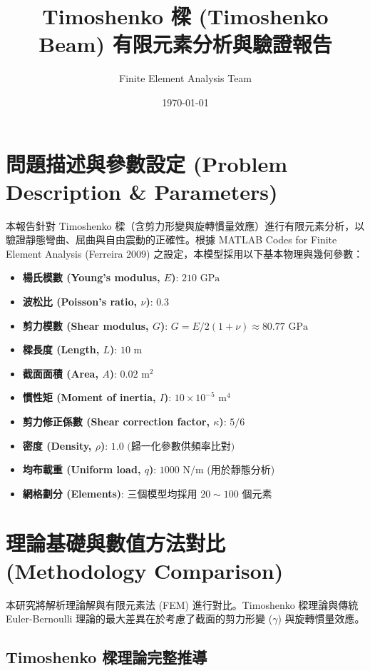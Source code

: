 \documentclass[UTF8, a4paper, 12pt]{ctexart}
\title{\textbf{Timoshenko 樑 (Timoshenko Beam) 有限元素分析與驗證報告}}
\author{Finite Element Analysis Team}
\date{\today}
\begin{document}
\maketitle

\section{問題描述與參數設定 (Problem Description \& Parameters)}

本報告針對 Timoshenko 樑（含剪力形變與旋轉慣量效應）進行有限元素分析，以驗證靜態彎曲、屈曲與自由震動的正確性。根據 MATLAB Codes for Finite Element Analysis (Ferreira 2009) 之設定，本模型採用以下基本物理與幾何參數：

\begin{itemize}
  \item \textbf{楊氏模數 (Young's modulus, $E$)}: $210 \text{ GPa}$
  \item \textbf{波松比 (Poisson's ratio, $\nu$)}: $0.3$
  \item \textbf{剪力模數 (Shear modulus, $G$)}: $G = E / 2(1+\nu) \approx 80.77 \text{ GPa}$
  \item \textbf{樑長度 (Length, $L$)}: $10 \text{ m}$
  \item \textbf{截面面積 (Area, $A$)}: $0.02 \text{ m}^2$
  \item \textbf{慣性矩 (Moment of inertia, $I$)}: $10 \times 10^{-5} \text{ m}^4$
  \item \textbf{剪力修正係數 (Shear correction factor, $\kappa$)}: $5/6$
  \item \textbf{密度 (Density, $\rho$)}: $1.0\text{ (歸一化參數供頻率比對)}$
  \item \textbf{均布載重 (Uniform load, $q$)}: $1000 \text{ N/m}$ (用於靜態分析)
  \item \textbf{網格劃分 (Elements)}: 三個模型均採用 $20\sim100$ 個元素
\end{itemize}

\section{理論基礎與數值方法對比 (Methodology Comparison)}

本研究將解析理論解與有限元素法 (FEM) 進行對比。Timoshenko 樑理論與傳統 Euler-Bernoulli 理論的最大差異在於考慮了截面的剪力形變 ($\gamma$) 與旋轉慣量效應。

\subsection{Timoshenko 樑理論完整推導}
\end{document}
